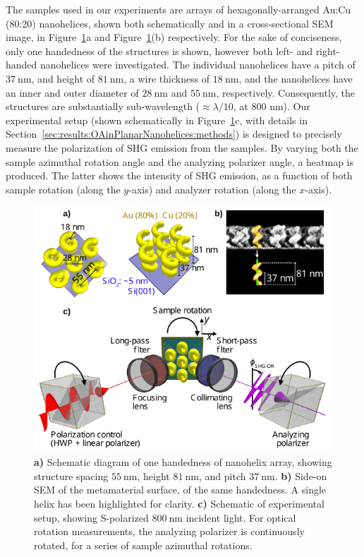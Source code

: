 The samples used in our experiments are arrays of hexagonally-arranged Au:Cu (80:20) nanohelices,\cite{Gibbs2014} shown both schematically and in a cross-sectional SEM image, in Figure~\ref{fig:results:OAinPlanarNanohelices:setup}a and Figure~\ref{fig:results:OAinPlanarNanohelices:setup}(b) respectively. 
For the sake of conciseness, only one handedness of the structures is shown, however both left- and right-handed nanohelices were investigated. The individual nanohelices have a pitch of $\SI{37}{\nano\m}$, and height of $\SI{81}{\nano\m}$, a wire thickness of $\SI{18}{\nano\m}$, and the nanohelices have an inner and outer diameter of $\SI{28}{\nano\m}$ and $\SI{55}{\nano\m}$, respectively. Consequently, the structures are substantially sub-wavelength ($\approx\lambda/10$, at 800 nm).
Our experimental setup (shown schematically in Figure~\ref{fig:results:OAinPlanarNanohelices:setup}c, with details in Section~\ref{sec:results:OAinPlanarNanohelices:methods}) is designed to precisely measure the polarization of SHG emission from the samples. By varying both the sample azimuthal rotation angle and the analyzing polarizer angle, a heatmap is produced. The latter shows the intensity of SHG emission, as a function of both sample rotation (along the $y$-axis) and analyzer rotation (along the $x$-axis). 

\begin{figure}[htb!]	
    \centering	
    \includegraphics[scale=1.0]{./figures/results/OAinPlanarNanohelices/setup.pdf}
    \caption{\label{fig:results:OAinPlanarNanohelices:setup}
    \textbf{a)} Schematic diagram of one handedness of nanohelix array, showing structure spacing $\SI{55}{\nano\m}$, height $\SI{81}{\nano\m}$, and pitch $\SI{37}{\nano\m}$. \textbf{b)} Side-on SEM of the metamaterial surface, of the same handedness. A single helix has been highlighted for clarity. \textbf{c)} Schematic of experimental setup, showing S-polarized $\SI{800}{\nano\m}$ incident light. For optical rotation measurements, the analyzing polarizer is continuously rotated, for a series of sample azimuthal rotations.}	
\end{figure}

